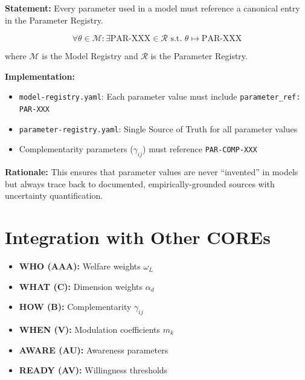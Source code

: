\begin{tcolorbox}[colback=red!5!white, colframe=red!75!black,
    title=Axiom UNMAPPED_PAR-4: Referential Integrity]
\textbf{Statement:} Every parameter used in a model must reference a canonical entry in the Parameter Registry.

\begin{equation}
\forall \theta \in \mathcal{M}: \exists \text{PAR-XXX} \in \mathcal{R} \text{ s.t. } \theta \mapsto \text{PAR-XXX}
\end{equation}

where $\mathcal{M}$ is the Model Registry and $\mathcal{R}$ is the Parameter Registry.

\textbf{Implementation:}
\begin{itemize}[nosep]
\item \texttt{model-registry.yaml}: Each parameter value must include \texttt{parameter\_ref: PAR-XXX}
\item \texttt{parameter-registry.yaml}: Single Source of Truth for all parameter values
\item Complementarity parameters ($\gamma_{ij}$) must reference \texttt{PAR-COMP-XXX}
\end{itemize}

\textbf{Rationale:} This ensures that parameter values are never ``invented'' in models but always trace back to documented, empirically-grounded sources with uncertainty quantification.
\end{tcolorbox}

\section{Integration with Other COREs}

\begin{tcolorbox}[colback=yellow!5!white, colframe=yellow!75!black,
    title=Integration: WHERE provides parameters to all COREs]
\begin{itemize}[nosep]
\item \textbf{WHO (AAA):} Welfare weights $\omega_L$
\item \textbf{WHAT (C):} Dimension weights $\alpha_d$
\item \textbf{HOW (B):} Complementarity $\gamma_{ij}$
\item \textbf{WHEN (V):} Modulation coefficients $m_k$
\item \textbf{AWARE (AU):} Awareness parameters
\item \textbf{READY (AV):} Willingness thresholds
\end{itemize}
\end{tcolorbox}

